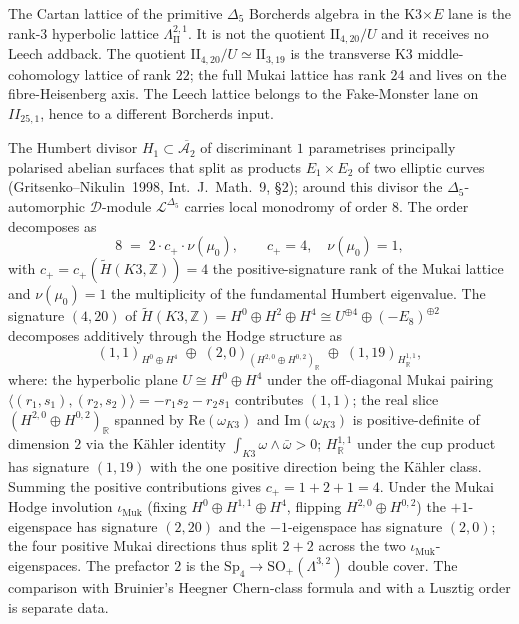 \begin{remark}
\label{rem:rank-23-cartan-leech-addback}
The Cartan lattice of the primitive $\Delta_5$ Borcherds algebra in the
K3$\times E$ lane is the rank-$3$ hyperbolic lattice
$\Lambda^{2,1}_{\mathrm{II}}$. It is not the quotient
$\mathrm{II}_{4,20}/U$ and it receives no Leech addback. The quotient
$\mathrm{II}_{4,20}/U\simeq \mathrm{II}_{3,19}$ is the transverse K3
middle-cohomology lattice of rank $22$; the full Mukai lattice has rank $24$ and
lives on the fibre-Heisenberg axis. The Leech lattice belongs to the
Fake-Monster lane on $II_{25,1}$, hence to a different Borcherds input.
\end{remark}

\begin{remark}[Humbert divisor $H_1$ monodromy order $8 = 2 c_+ \nu(\mu_0)$ with $c_+ = 4$]
\label{rem:humbert-H1-order-8}
The Humbert divisor $H_1 \subset \overline{\mathcal{A}_2}$ of discriminant $1$ parametrises principally polarised abelian surfaces that split as products $E_1 \times E_2$ of two elliptic curves (Gritsenko--Nikulin~1998, Int.\ J.\ Math.\ 9, \S 2); around this divisor the $\Delta_5$-automorphic $\mathcal{D}$-module $\mathcal{L}^{\Delta_5}$ carries local monodromy of order $8$. The order decomposes as
\[
 8 \;=\; 2 \cdot c_+ \cdot \nu(\mu_0), \qquad c_+ = 4, \quad \nu(\mu_0) = 1,
\]
with $c_+ = c_+(\widetilde H(K3, \mathbb{Z})) = 4$ the positive-signature rank of the Mukai lattice and $\nu(\mu_0) = 1$ the multiplicity of the fundamental Humbert eigenvalue. The signature $(4, 20)$ of $\widetilde H(K3, \mathbb{Z}) = H^0 \oplus H^2 \oplus H^4 \cong U^{\oplus 4} \oplus (-E_8)^{\oplus 2}$ decomposes additively through the Hodge structure as
\[
 (1, 1)_{H^0 \oplus H^4} \;\oplus\; (2, 0)_{(H^{2, 0} \oplus H^{0, 2})_\mathbb{R}} \;\oplus\; (1, 19)_{H^{1, 1}_\mathbb{R}},
\]
where: the hyperbolic plane $U \cong H^0 \oplus H^4$ under the off-diagonal Mukai pairing $\langle (r_1, s_1), (r_2, s_2)\rangle = -r_1 s_2 - r_2 s_1$ contributes $(1, 1)$; the real slice $(H^{2, 0} \oplus H^{0, 2})_\mathbb{R}$ spanned by $\mathrm{Re}(\omega_{K3})$ and $\mathrm{Im}(\omega_{K3})$ is positive-definite of dimension $2$ via the K\"ahler identity $\int_{K3} \omega \wedge \bar\omega > 0$; $H^{1, 1}_\mathbb{R}$ under the cup product has signature $(1, 19)$ with the one positive direction being the K\"ahler class. Summing the positive contributions gives $c_+ = 1 + 2 + 1 = 4$. Under the Mukai Hodge involution $\iota_{\mathrm{Muk}}$ (fixing $H^0 \oplus H^{1, 1} \oplus H^4$, flipping $H^{2, 0} \oplus H^{0, 2}$) the $+1$-eigenspace has signature $(2, 20)$ and the $-1$-eigenspace has signature $(2, 0)$; the four positive Mukai directions thus split $2 + 2$ across the two $\iota_{\mathrm{Muk}}$-eigenspaces. The prefactor $2$ is the $\mathrm{Sp}_4 \to \mathrm{SO}_+(\Lambda^{3, 2})$ double cover. The comparison with Bruinier's Heegner Chern-class formula and with a Lusztig order is separate data.


\end{remark}
